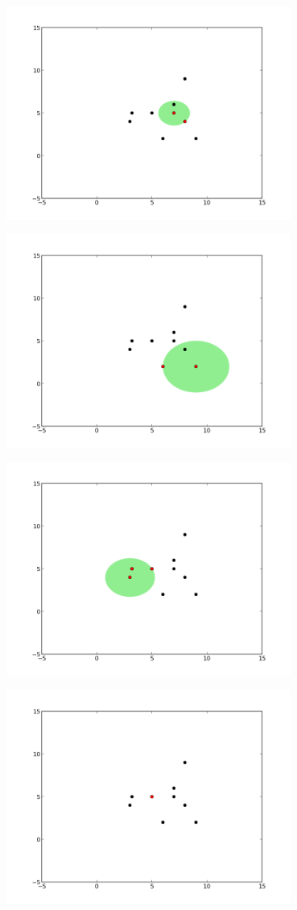 \documentclass[12pt,fleqn]{article}\usepackage{../common}
\begin{document}
\includegraphics[height=7cm]{knn5.png}

\includegraphics[height=7cm]{knn6.png}

\includegraphics[height=7cm]{knn7.png}

\includegraphics[height=7cm]{knn8.png}
\end{document}
